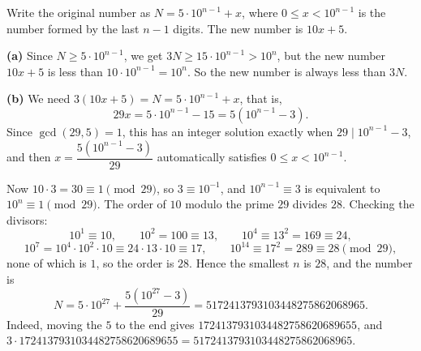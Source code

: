 Write the original number as $N=5\cdot10^{n-1}+x$, where $0\le x<10^{n-1}$ is the number formed by the last $n-1$ digits. The new number is $10x+5$.

\textbf{(a)} Since $N\ge5\cdot10^{n-1}$, we get $3N\ge15\cdot10^{n-1}>10^n$, but the new number $10x+5$ is less than $10\cdot10^{n-1}=10^n$. So the new number is always less than $3N$.

\textbf{(b)} We need $3(10x+5)=N=5\cdot10^{n-1}+x$, that is,
\[29x=5\cdot10^{n-1}-15=5\left(10^{n-1}-3\right).\]
Since $\gcd(29,5)=1$, this has an integer solution exactly when $29\mid10^{n-1}-3$, and then $x=\dfrac{5\left(10^{n-1}-3\right)}{29}$ automatically satisfies $0\le x<10^{n-1}$.

Now $10\cdot3=30\equiv1\pmod{29}$, so $3\equiv10^{-1}$, and $10^{n-1}\equiv3$ is equivalent to $10^{n}\equiv1\pmod{29}$. The order of $10$ modulo the prime $29$ divides $28$. Checking the divisors:
\[10^1\equiv10,\qquad 10^2=100\equiv13,\qquad 10^4\equiv13^2=169\equiv24,\]
\[10^7=10^4\cdot10^2\cdot10\equiv24\cdot13\cdot10\equiv17,\qquad 10^{14}\equiv17^2=289\equiv28\pmod{29},\]
none of which is $1$, so the order is $28$. Hence the smallest $n$ is $\boxed{28}$, and the number is
\[N=5\cdot10^{27}+\dfrac{5\left(10^{27}-3\right)}{29}=\boxed{5172413793103448275862068965}.\]
Indeed, moving the $5$ to the end gives $1724137931034482758620689655$, and $3\cdot1724137931034482758620689655=5172413793103448275862068965$.
